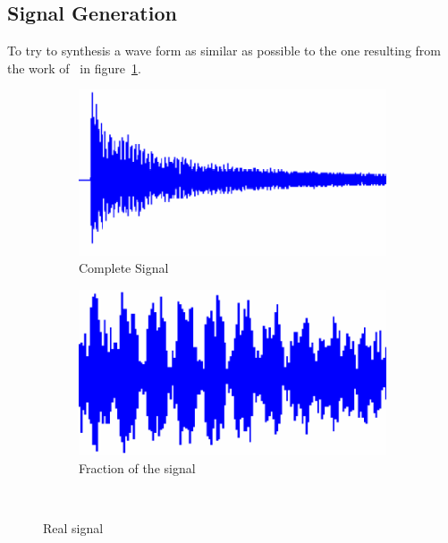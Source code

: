 \subsection{Signal Generation}\label{subsec:sigGen}
To try to synthesis a wave form as similar as possible to the one resulting from the work of~\citeauthor{wuLiquidLevelDetector2014b} in figure~\ref{fig:realsignalWu}.
\begin{figure}[]
    \centering
    \begin{subfigure}{0.45\textwidth}
        \centering
        \includegraphics[width=\linewidth]{Chapters/6CHP/Figures/completesignalWu.pdf}
        \caption{Complete Signal}{}
    \end{subfigure}
    \begin{subfigure}{0.45\textwidth}
        \centering
        \includegraphics[width=\linewidth]{Chapters/6CHP/Figures/fractionWu.pdf}
        \caption{Fraction of the signal}{}
    \end{subfigure}
    \caption{Real signal}{~\cite{wuLiquidLevelDetector2014b}}
     \label{fig:realsignalWu}
 \end{figure}
